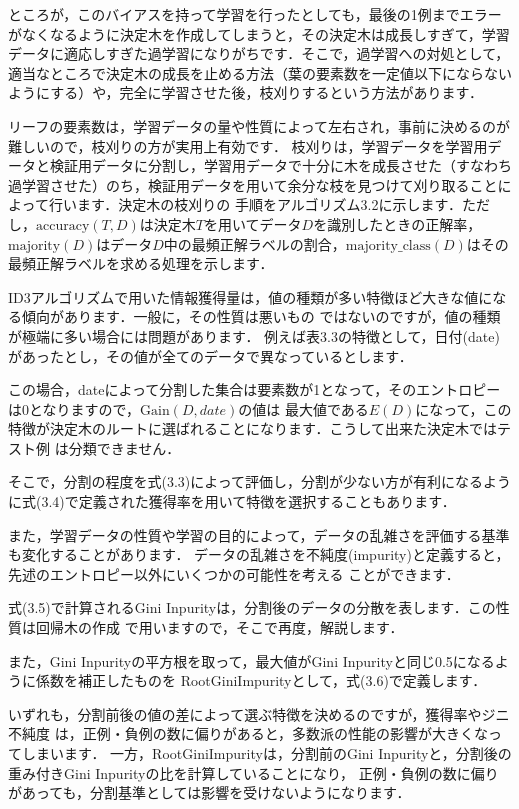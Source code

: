 ところが，このバイアスを持って学習を行ったとしても，最後の1例までエラーがなくなるように決定木を作成してしまうと，その決定木は成長しすぎて，学習データに適応しすぎた過学習になりがちです．そこで，過学習への対処として，
適当なところで決定木の成長を止める方法（葉の要素数を一定値以下にならないようにする）や，完全に学習させた後，枝刈りするという方法があります．


リーフの要素数は，学習データの量や性質によって左右され，事前に決めるのが難しいので，枝刈りの方が実用上有効です．
枝刈りは，学習データを学習用データと検証用データに分割し，学習用データで十分に木を成長させた（すなわち
過学習させた）のち，検証用データを用いて余分な枝を見つけて刈り取ることによって行います．決定木の枝刈りの
手順をアルゴリズム3.2に示します．ただし，$\mbox{accuracy}(T, D)$は決定木$T$を用いてデータ$D$を識別したときの正解率，
$\mbox{majority}(D)$はデータ$D$中の最頻正解ラベルの割合，$\mbox{majority\_class}(D)$はその最頻正解ラベルを求める処理を示します．


ID3アルゴリズムで用いた情報獲得量は，値の種類が多い特徴ほど大きな値になる傾向があります．一般に，その性質は悪いもの
ではないのですが，値の種類が極端に多い場合には問題があります．
例えば表3.3の特徴として，日付(date)があったとし，その値が全てのデータで異なっているとします．

この場合，dateによって分割した集合は要素数が1となって，そのエントロピーは0となりますので，$\mbox{Gain}(D, date)$の値は
最大値である$E(D)$になって，この特徴が決定木のルートに選ばれることになります．こうして出来た決定木ではテスト例
は分類できません．

そこで，分割の程度を式(3.3)によって評価し，分割が少ない方が有利になるように式(3.4)で定義された獲得率を用いて特徴を選択することもあります．

また，学習データの性質や学習の目的によって，データの乱雑さを評価する基準も変化することがあります．
データの乱雑さを不純度(impurity)と定義すると，先述のエントロピー以外にいくつかの可能性を考える
ことができます．

式(3.5)で計算されるGini Inpurityは，分割後のデータの分散を表します．この性質は回帰木の作成
で用いますので，そこで再度，解説します．

また，Gini Inpurityの平方根を取って，最大値がGini Inpurityと同じ0.5になるように係数を補正したものを
RootGiniImpurityとして，式(3.6)で定義します．

いずれも，分割前後の値の差によって選ぶ特徴を決めるのですが，獲得率やジニ不純度
は，正例・負例の数に偏りがあると，多数派の性能の影響が大きくなってしまいます．
一方，RootGiniImpurityは，分割前のGini Inpurityと，分割後の重み付きGini Inpurityの比を計算していることになり，
正例・負例の数に偏りがあっても，分割基準としては影響を受けないようになります．

